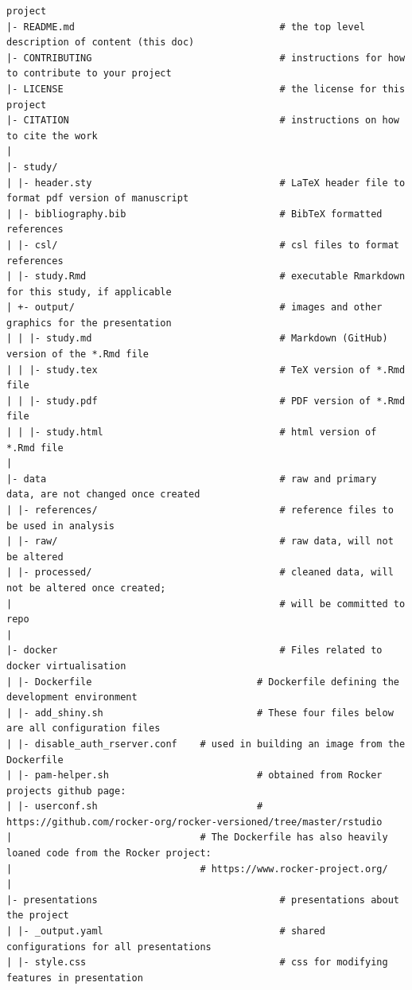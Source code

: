 \documentclass[
]{article}
\begin{document}
\begin{verbatim}
project
|- README.md                                    # the top level description of content (this doc)
|- CONTRIBUTING                                 # instructions for how to contribute to your project
|- LICENSE                                      # the license for this project
|- CITATION                                     # instructions on how to cite the work
|
|- study/
| |- header.sty                                 # LaTeX header file to format pdf version of manuscript
| |- bibliography.bib                           # BibTeX formatted references
| |- csl/                                       # csl files to format references
| |- study.Rmd                                  # executable Rmarkdown for this study, if applicable
| +- output/                                    # images and other graphics for the presentation
| | |- study.md                                 # Markdown (GitHub) version of the *.Rmd file
| | |- study.tex                                # TeX version of *.Rmd file
| | |- study.pdf                                # PDF version of *.Rmd file
| | |- study.html                               # html version of *.Rmd file
|
|- data                                         # raw and primary data, are not changed once created
| |- references/                                # reference files to be used in analysis
| |- raw/                                       # raw data, will not be altered
| |- processed/                                 # cleaned data, will not be altered once created;
|                                               # will be committed to repo
|
|- docker                                       # Files related to docker virtualisation
| |- Dockerfile                             # Dockerfile defining the development environment
| |- add_shiny.sh                           # These four files below are all configuration files
| |- disable_auth_rserver.conf    # used in building an image from the Dockerfile
| |- pam-helper.sh                          # obtained from Rocker projects github page:
| |- userconf.sh                            # https://github.com/rocker-org/rocker-versioned/tree/master/rstudio
|                                 # The Dockerfile has also heavily loaned code from the Rocker project:
|                                 # https://www.rocker-project.org/
|
|- presentations                                # presentations about the project 
| |- _output.yaml                               # shared configurations for all presentations
| |- style.css                                  # css for modifying features in presentation

\end{verbatim}
\end{document}

